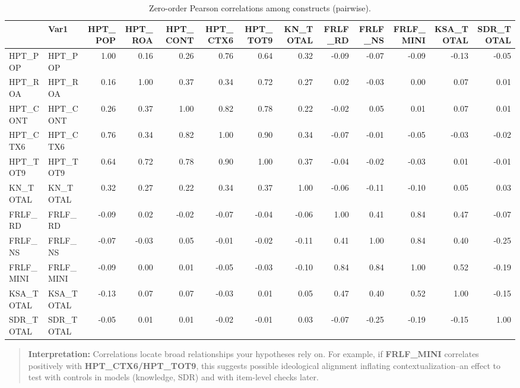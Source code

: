 \documentclass[
  10pt,
]{article}
\begin{document}
\begin{longtable}[t]{llrrrrrrrrrrr}
\caption{\label{tab:cor-table}Zero-order Pearson correlations among constructs (pairwise).}\\
\toprule
 & Var1 & HPT\_POP & HPT\_ROA & HPT\_CONT & HPT\_CTX6 & HPT\_TOT9 & KN\_TOTAL & FRLF\_RD & FRLF\_NS & FRLF\_MINI & KSA\_TOTAL & SDR\_TOTAL\\
\midrule
HPT\_POP & HPT\_POP & 1.00 & 0.16 & 0.26 & 0.76 & 0.64 & 0.32 & -0.09 & -0.07 & -0.09 & -0.13 & -0.05\\
HPT\_ROA & HPT\_ROA & 0.16 & 1.00 & 0.37 & 0.34 & 0.72 & 0.27 & 0.02 & -0.03 & 0.00 & 0.07 & 0.01\\
HPT\_CONT & HPT\_CONT & 0.26 & 0.37 & 1.00 & 0.82 & 0.78 & 0.22 & -0.02 & 0.05 & 0.01 & 0.07 & 0.01\\
HPT\_CTX6 & HPT\_CTX6 & 0.76 & 0.34 & 0.82 & 1.00 & 0.90 & 0.34 & -0.07 & -0.01 & -0.05 & -0.03 & -0.02\\
HPT\_TOT9 & HPT\_TOT9 & 0.64 & 0.72 & 0.78 & 0.90 & 1.00 & 0.37 & -0.04 & -0.02 & -0.03 & 0.01 & -0.01\\
\addlinespace
KN\_TOTAL & KN\_TOTAL & 0.32 & 0.27 & 0.22 & 0.34 & 0.37 & 1.00 & -0.06 & -0.11 & -0.10 & 0.05 & 0.03\\
FRLF\_RD & FRLF\_RD & -0.09 & 0.02 & -0.02 & -0.07 & -0.04 & -0.06 & 1.00 & 0.41 & 0.84 & 0.47 & -0.07\\
FRLF\_NS & FRLF\_NS & -0.07 & -0.03 & 0.05 & -0.01 & -0.02 & -0.11 & 0.41 & 1.00 & 0.84 & 0.40 & -0.25\\
FRLF\_MINI & FRLF\_MINI & -0.09 & 0.00 & 0.01 & -0.05 & -0.03 & -0.10 & 0.84 & 0.84 & 1.00 & 0.52 & -0.19\\
KSA\_TOTAL & KSA\_TOTAL & -0.13 & 0.07 & 0.07 & -0.03 & 0.01 & 0.05 & 0.47 & 0.40 & 0.52 & 1.00 & -0.15\\
\addlinespace
SDR\_TOTAL & SDR\_TOTAL & -0.05 & 0.01 & 0.01 & -0.02 & -0.01 & 0.03 & -0.07 & -0.25 & -0.19 & -0.15 & 1.00\\
\bottomrule
\end{longtable}

\begin{quote}
\textbf{Interpretation:} Correlations locate broad relationships your
hypotheses rely on. For example, if \textbf{FRLF\_MINI} correlates
positively with \textbf{HPT\_CTX6/HPT\_TOT9}, this suggests possible
ideological alignment inflating contextualization--an effect to test
with controls in models (knowledge, SDR) and with item-level checks
later.
\end{quote}
\end{document}
